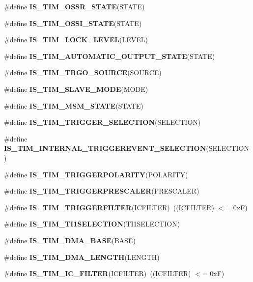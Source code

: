 \begin{DoxyCompactItemize}
\item 
\#define {\bfseries I\-S\-\_\-\-T\-I\-M\-\_\-\-O\-S\-S\-R\-\_\-\-S\-T\-A\-T\-E}(S\-T\-A\-T\-E)
\item 
\#define {\bfseries I\-S\-\_\-\-T\-I\-M\-\_\-\-O\-S\-S\-I\-\_\-\-S\-T\-A\-T\-E}(S\-T\-A\-T\-E)
\item 
\#define {\bfseries I\-S\-\_\-\-T\-I\-M\-\_\-\-L\-O\-C\-K\-\_\-\-L\-E\-V\-E\-L}(L\-E\-V\-E\-L)
\item 
\#define {\bfseries I\-S\-\_\-\-T\-I\-M\-\_\-\-A\-U\-T\-O\-M\-A\-T\-I\-C\-\_\-\-O\-U\-T\-P\-U\-T\-\_\-\-S\-T\-A\-T\-E}(S\-T\-A\-T\-E)
\item 
\#define {\bfseries I\-S\-\_\-\-T\-I\-M\-\_\-\-T\-R\-G\-O\-\_\-\-S\-O\-U\-R\-C\-E}(S\-O\-U\-R\-C\-E)
\item 
\#define {\bfseries I\-S\-\_\-\-T\-I\-M\-\_\-\-S\-L\-A\-V\-E\-\_\-\-M\-O\-D\-E}(M\-O\-D\-E)
\item 
\#define {\bfseries I\-S\-\_\-\-T\-I\-M\-\_\-\-M\-S\-M\-\_\-\-S\-T\-A\-T\-E}(S\-T\-A\-T\-E)
\item 
\#define {\bfseries I\-S\-\_\-\-T\-I\-M\-\_\-\-T\-R\-I\-G\-G\-E\-R\-\_\-\-S\-E\-L\-E\-C\-T\-I\-O\-N}(S\-E\-L\-E\-C\-T\-I\-O\-N)
\item 
\#define {\bfseries I\-S\-\_\-\-T\-I\-M\-\_\-\-I\-N\-T\-E\-R\-N\-A\-L\-\_\-\-T\-R\-I\-G\-G\-E\-R\-E\-V\-E\-N\-T\-\_\-\-S\-E\-L\-E\-C\-T\-I\-O\-N}(S\-E\-L\-E\-C\-T\-I\-O\-N)
\item 
\#define {\bfseries I\-S\-\_\-\-T\-I\-M\-\_\-\-T\-R\-I\-G\-G\-E\-R\-P\-O\-L\-A\-R\-I\-T\-Y}(P\-O\-L\-A\-R\-I\-T\-Y)
\item 
\#define {\bfseries I\-S\-\_\-\-T\-I\-M\-\_\-\-T\-R\-I\-G\-G\-E\-R\-P\-R\-E\-S\-C\-A\-L\-E\-R}(P\-R\-E\-S\-C\-A\-L\-E\-R)
\item 
\hypertarget{group___t_i_m___private___macros_gaa1f78b846d7c6c3d54dd35f2ecdabd2f}{\#define {\bfseries I\-S\-\_\-\-T\-I\-M\-\_\-\-T\-R\-I\-G\-G\-E\-R\-F\-I\-L\-T\-E\-R}(I\-C\-F\-I\-L\-T\-E\-R)~((I\-C\-F\-I\-L\-T\-E\-R) $<$= 0x\-F)}\label{group___t_i_m___private___macros_gaa1f78b846d7c6c3d54dd35f2ecdabd2f}

\item 
\#define {\bfseries I\-S\-\_\-\-T\-I\-M\-\_\-\-T\-I1\-S\-E\-L\-E\-C\-T\-I\-O\-N}(T\-I1\-S\-E\-L\-E\-C\-T\-I\-O\-N)
\item 
\#define {\bfseries I\-S\-\_\-\-T\-I\-M\-\_\-\-D\-M\-A\-\_\-\-B\-A\-S\-E}(B\-A\-S\-E)
\item 
\#define {\bfseries I\-S\-\_\-\-T\-I\-M\-\_\-\-D\-M\-A\-\_\-\-L\-E\-N\-G\-T\-H}(L\-E\-N\-G\-T\-H)
\item 
\hypertarget{group___t_i_m___private___macros_ga19ecc5fc2e1ce1697c3dbbb9809ca243}{\#define {\bfseries I\-S\-\_\-\-T\-I\-M\-\_\-\-I\-C\-\_\-\-F\-I\-L\-T\-E\-R}(I\-C\-F\-I\-L\-T\-E\-R)~((I\-C\-F\-I\-L\-T\-E\-R) $<$= 0x\-F)}\label{group___t_i_m___private___macros_ga19ecc5fc2e1ce1697c3dbbb9809ca243}


\end{DoxyCompactItemize}
